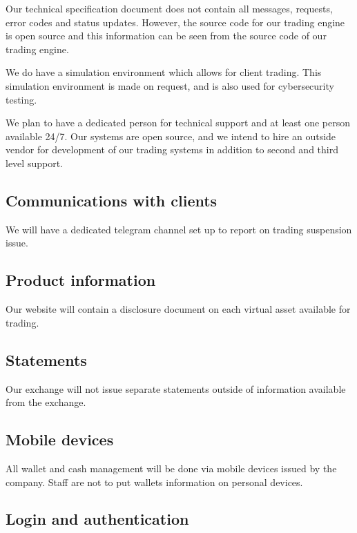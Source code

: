 Our technical specification document does not contain all messages,
requests, error codes and status updates.  However, the source code
for our trading engine is open source and this information can be seen
from the source code of our trading engine.

We do have a simulation environment which allows for client
trading.  This simulation environment is made on request, and is also
used for cybersecurity testing.

We plan to have a dedicated person for technical support and at least
one person available 24/7.  Our systems are open source, and we intend
to hire an outside vendor for development of our trading systems in
addition to second and third level support.

\subsection{Communications with clients}
We will have a dedicated telegram channel set up to report on trading
suspension issue.

\subsection{Product information}
Our website will contain a disclosure document on each virtual asset
available for trading.

\subsection{Statements}
Our exchange will not issue separate statements outside of information
available from the exchange.

\subsection{Mobile devices}
All wallet and cash management will be done via mobile devices issued
by the company.  Staff are not to put wallets information on personal
devices.

\subsection{Login and authentication}

